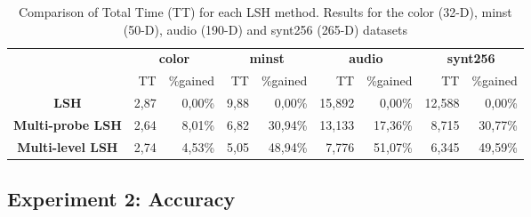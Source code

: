 \begin{table}[!t]
    \centering
    \begin{footnotesize}
     \begin{tabular}{c|r|r|r|r|r|r|r|r|}
    \cline{2-9}
    & \multicolumn{ 2}{|c|}{{\bf color}} & \multicolumn{ 2}{|c|}{{\bf minst}} & \multicolumn{ 2}{|c|}{{\bf audio}} & \multicolumn{ 2}{|c|}{{\bf synt256}} \\
    \cline{2-9}
    & TT    & \%gained & TT    & \%gained & TT    & \%gained & TT    & \%gained \\
    \hline
    \multicolumn{1}{|c|}{\bf LSH} & 2,87  & 0,00\% & 9,88  & 0,00\% & 15,892 & 0,00\% & 12,588 & 0,00\% \\
    \multicolumn{1}{|c|}{\bf Multi-probe LSH} & 2,64  & 8,01\% & 6,82  & 30,94\% & 13,133 & 17,36\% & 8,715 & 30,77\% \\
    \multicolumn{1}{|c|}{\bf Multi-level LSH} & 2,74  & 4,53\% & 5,05  & 48,94\% & 7,776 & 51,07\% & 6,345 & 49,59\% \\
    \hline
    \end{tabular}
\end{footnotesize}

\caption{Comparison of Total Time (TT) for each LSH method. Results for the color (32-D), minst (50-D), audio (190-D) and synt256 (265-D) datasets}
\label{tab:tt}
\end{table}


\subsection{Experiment 2: Accuracy}

